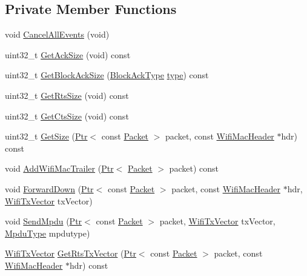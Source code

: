 \subsection*{Private Member Functions}
\begin{DoxyCompactItemize}
\item 
void \hyperlink{classns3_1_1MacLow_afecf8a67fd2052dc23f94e77b9768d6b}{Cancel\+All\+Events} (void)
\item 
uint32\+\_\+t \hyperlink{classns3_1_1MacLow_a87ec7765a9299e0a3997a972e146171f}{Get\+Ack\+Size} (void) const 
\item 
uint32\+\_\+t \hyperlink{classns3_1_1MacLow_a2a57939c6cb34116ae21763bf9505fbf}{Get\+Block\+Ack\+Size} (\hyperlink{namespacens3_a90f436472d19d7d7f37cbf0b8c288ff7}{Block\+Ack\+Type} \hyperlink{visualizer-ideas_8txt_add98db9e15e2a58cf2b57623e7aa893a}{type}) const 
\item 
uint32\+\_\+t \hyperlink{classns3_1_1MacLow_a2eca2a2e6be1438bedbe85034acf5a2c}{Get\+Rts\+Size} (void) const 
\item 
uint32\+\_\+t \hyperlink{classns3_1_1MacLow_a43e590838afbd8a9a01cc2936837b091}{Get\+Cts\+Size} (void) const 
\item 
uint32\+\_\+t \hyperlink{classns3_1_1MacLow_a19511f9a1fc507cab3e16c85d2249f7e}{Get\+Size} (\hyperlink{classns3_1_1Ptr}{Ptr}$<$ const \hyperlink{classns3_1_1Packet}{Packet} $>$ packet, const \hyperlink{classns3_1_1WifiMacHeader}{Wifi\+Mac\+Header} $\ast$hdr) const 
\item 
void \hyperlink{classns3_1_1MacLow_acaafc67755f16f347e9161310d71e3ef}{Add\+Wifi\+Mac\+Trailer} (\hyperlink{classns3_1_1Ptr}{Ptr}$<$ \hyperlink{classns3_1_1Packet}{Packet} $>$ packet) const 
\item 
void \hyperlink{classns3_1_1MacLow_a4eefbfa3d57539dadf0224cc7fcf952d}{Forward\+Down} (\hyperlink{classns3_1_1Ptr}{Ptr}$<$ const \hyperlink{classns3_1_1Packet}{Packet} $>$ packet, const \hyperlink{classns3_1_1WifiMacHeader}{Wifi\+Mac\+Header} $\ast$hdr, \hyperlink{classns3_1_1WifiTxVector}{Wifi\+Tx\+Vector} tx\+Vector)
\item 
void \hyperlink{classns3_1_1MacLow_a0ec344c3a1200d8d66273614949c6b35}{Send\+Mpdu} (\hyperlink{classns3_1_1Ptr}{Ptr}$<$ const \hyperlink{classns3_1_1Packet}{Packet} $>$ packet, \hyperlink{classns3_1_1WifiTxVector}{Wifi\+Tx\+Vector} tx\+Vector, \hyperlink{namespacens3_ae617d41bbd0c07fa58ee2306f687b055}{Mpdu\+Type} mpdutype)
\item 
\hyperlink{classns3_1_1WifiTxVector}{Wifi\+Tx\+Vector} \hyperlink{classns3_1_1MacLow_ac6133f8084d7d290687da468665e36a0}{Get\+Rts\+Tx\+Vector} (\hyperlink{classns3_1_1Ptr}{Ptr}$<$ const \hyperlink{classns3_1_1Packet}{Packet} $>$ packet, const \hyperlink{classns3_1_1WifiMacHeader}{Wifi\+Mac\+Header} $\ast$hdr) const 

\end{DoxyCompactItemize}
